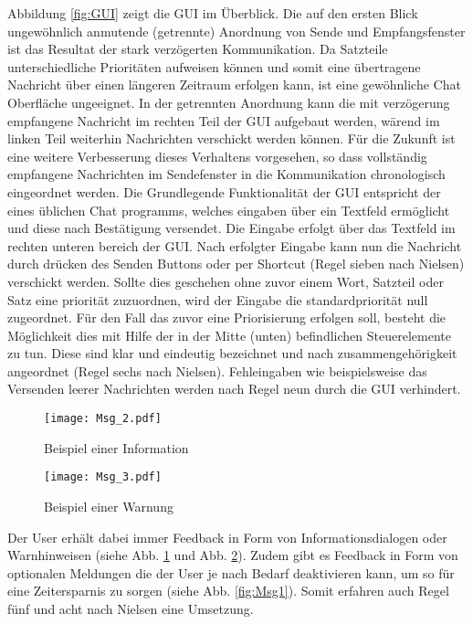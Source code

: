 Abbildung \ref{fig:GUI} zeigt die GUI im {\"U}berblick. Die auf den
ersten Blick ungew{\"o}hnlich anmutende (getrennte) Anordnung von Sende und
Empfangsfenster ist das Resultat der stark verz{\"o}gerten Kommunikation. Da
Satzteile unterschiedliche Priorit{\"a}ten aufweisen k{\"o}nnen und somit eine
{\"u}bertragene Nachricht {\"u}ber einen l{\"a}ngeren Zeitraum erfolgen kann,
ist eine gew{\"o}hnliche Chat Oberfl{\"a}che ungeeignet. In der getrennten
Anordnung kann die mit verz{\"o}gerung empfangene Nachricht im rechten Teil der
GUI aufgebaut werden, w{\"a}rend im linken Teil weiterhin Nachrichten verschickt
werden k{\"o}nnen. F{\"u}r die Zukunft ist eine weitere Verbesserung dieses
Verhaltens vorgesehen, so dass vollst{\"a}ndig empfangene Nachrichten im
Sendefenster in die Kommunikation chronologisch eingeordnet werden. Die
Grundlegende Funktionalit{\"a}t der GUI entspricht der eines {\"u}blichen Chat
programms, welches eingaben {\"u}ber ein Textfeld erm{\"o}glicht und diese nach
Best{\"a}tigung versendet. Die Eingabe erfolgt {\"u}ber das Textfeld im rechten unteren
bereich der GUI. Nach erfolgter Eingabe kann nun die Nachricht durch dr{\"u}cken des
Senden Buttons oder per Shortcut (Regel sieben nach Nielsen) verschickt werden.
Sollte dies geschehen ohne zuvor einem Wort, Satzteil oder Satz eine priorit{\"a}t zuzuordnen, wird der Eingabe
die standardpriorit{\"a}t null zugeordnet. F{\"u}r den Fall das zuvor eine
Priorisierung erfolgen soll, besteht die M{\"o}glichkeit dies mit Hilfe der in
der Mitte (unten) befindlichen Steuerelemente zu tun. Diese sind klar und
eindeutig bezeichnet und nach zusammengeh{\"o}rigkeit angeordnet (Regel sechs
nach Nielsen). Fehleingaben wie beispielsweise das Versenden leerer Nachrichten
werden nach Regel neun durch die GUI verhindert.

\begin{figure}[H]
\centering
\texttt{[image: Msg\_2.pdf]}
\caption{Beispiel einer Information}
\label{fig:Msg2}
\end{figure}

\begin{figure}[H]
\centering
\texttt{[image: Msg\_3.pdf]}
\caption{Beispiel einer Warnung}
\label{fig:Msg3}
\end{figure}

Der User erh{\"a}lt dabei immer Feedback in Form von
Informationsdialogen oder Warnhinweisen (siehe Abb. \ref{fig:Msg2} und Abb.
\ref{fig:Msg3}). Zudem gibt es Feedback in Form von optionalen Meldungen die der
User je nach Bedarf deaktivieren kann, um so f{\"u}r eine Zeitersparnis zu
sorgen (siehe Abb. \ref{fig:Msg1}). Somit erfahren auch Regel f{\"u}nf und acht
nach Nielsen eine Umsetzung.

